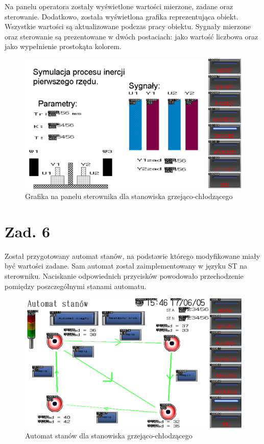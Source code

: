 \documentclass[a4paper,titlepage,11pt,twosides,floatssmall]{mwrep}
\begin{document}
Na panelu operatora zostały wyświetlone wartości mierzone, zadane oraz sterowanie. Dodatkowo, została wyświetlona grafika reprezentująca obiekt. Wszystkie wartości są aktualizowane podczas pracy obiektu. Sygnały mierzone oraz sterowanie są prezentowane w dwóch postaciach: jako wartość liczbowa oraz jako wypełnienie prostokąta kolorem.

\begin{figure}[]
	\centering
	\includegraphics[scale=0.6]{../graphics2.pdf}
	\caption{Grafika na panelu sterownika dla stanowiska grzejąco-chłodzącego}
	\label{zad5_graph}
\end{figure}


\chapter{Zad. 6}

Został przygotowany automat stanów, na podstawie którego modyfikowane miały być wartości zadane. Sam automat został zaimplementowany w języku ST na sterowniku. Naciskanie odpowiednich przycisków powodowało przechodzenie pomiędzy poszczególnymi stanami automatu.

\begin{figure}[]
	\centering
	\includegraphics[scale=0.6]{../graphics.pdf}
	\caption{Automat stanów dla stanowiska grzejąco-chłodzącego}
	\label{zad6_graph}
\end{figure}
\end{document}
